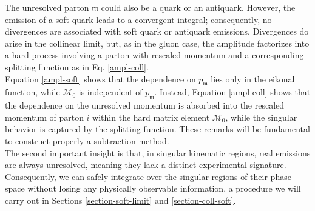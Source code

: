 \documentclass[a4paper, 12pt]{book}
\newcommand{\um}{\mathfrak{m}}
\begin{document}
The unresolved parton $\um$ could also be a quark or an antiquark. However, the emission of a soft quark leads to a convergent integral; consequently, no divergences are associated with soft quark or antiquark emissions. Divergences do arise in the collinear limit, but, as in the gluon case, the amplitude factorizes into a hard process involving a parton with rescaled momentum and a corresponding splitting function as in Eq. \ref{ampl-coll}. \\
Equation \ref{ampl-soft} shows that the dependence on $p_\um$ lies only in the eikonal function, while $\mathcal{M}_0$ is independent of $p_\um$. Instead, Equation \ref{ampl-coll} shows that the dependence on the unresolved momentum is absorbed into the rescaled momentum of parton $i$ within the hard matrix element $\mathcal{M}_0$, while the singular behavior is captured by the splitting function. These remarks will be fundamental to construct properly a subtraction method. \\
The second important insight is that, in singular kinematic regions, real emissions are always unresolved, meaning they lack a distinct experimental signature. Consequently, we can safely integrate over the singular regions of their phase space without losing any physically observable information, a procedure we will carry out in Sections \ref{section-soft-limit} and \ref{section-coll-soft}. 
\end{document}
